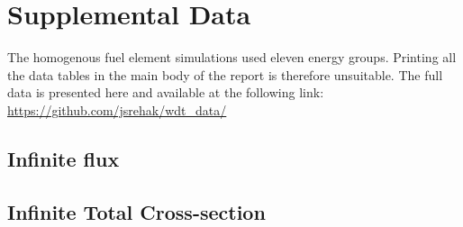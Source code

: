 
\chapter{Supplemental Data}
\label{chap:homog_data}

The homogenous fuel element simulations used eleven energy
groups. Printing all the data tables in the main body of the report
is therefore unsuitable. The full data is presented here and available
at the following link: \url{https://github.com/jsrehak/wdt_data/}

\begin{landscape}
  \section{Infinite flux}
\label{sec:homog_inf_flx_data}

\newpage
\section{Infinite Total Cross-section}
\label{sec:homog_inf_tot_data}


\end{landscape}
